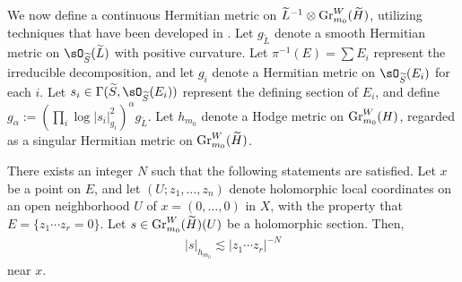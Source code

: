 \documentclass[11pt,letterpaper]{amsart}
\numberwithin{equation}{section}
\begin{document}
	\subsubsection{}
	We now define a continuous Hermitian metric on $\widetilde{L}^{-1} \otimes {\rm Gr}^W_{m_0}(\widetilde{H})$, utilizing techniques that have been developed in \cite{VZ2003,PTW2019,DLSZ}. Let $g_{\widetilde{L}}$ denote a smooth Hermitian metric on $\sO_{\widetilde{S}}(\widetilde{L})$ with positive curvature. Let $\pi^{-1}(E) = \sum E_i$ represent the irreducible decomposition, and let $g_{i}$ denote a Hermitian metric on $\sO_{\widetilde{S}}(E_i)$ for each $i$. Let $s_i \in \Gamma(\widetilde{S}, \sO_{\widetilde{S}}(E_i))$ represent the defining section of $E_i$, and define $g_{\alpha} := (\prod_i \log |s_i|^2_{g_i})^{\alpha} g_{\widetilde{L}}$. Let $h_{m_0}$ denote a Hodge metric on ${\rm Gr}^W_{m_0}(H)$, regarded as a singular Hermitian metric on ${\rm Gr}^W_{m_0}(\widetilde{H})$. 
	\begin{prop}\label{prop_MHmetric_upperbound}  
		There exists an integer $N$ such that the following statements are satisfied. Let $x$ be a point on $E$, and let $(U; z_1, \dots, z_n)$ denote holomorphic local coordinates on an open neighborhood $U$ of $x = (0, \dots, 0)$ in $X$, with the property that $E = \{z_1 \cdots z_r = 0\}$. Let $s \in {\rm Gr}^W_{m_0}(\widetilde{H})(U)$ be a holomorphic section. Then,  
		\begin{align}\label{align_norm_upperbound}  
			|s|_{h_{m_0}} \lesssim |z_1 \cdots z_r|^{-N}  
		\end{align}  
		near $x$.
	\end{prop}
\end{document}
